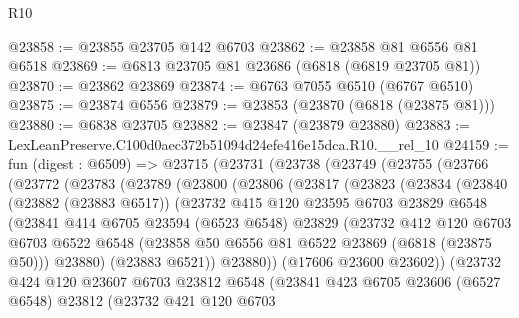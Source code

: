 \begin{lexlean}{R10}
\begin{coremodule}
@23858 := @23855 @23705 @142 @6703
@23862 := @23858 @81 @6556 @81 @6518
@23869 := @6813 @23705 @81 @23686 (@6818 (@6819 @23705 @81))
@23870 := @23862 @23869
@23874 := @6763 @7055 @6510 (@6767 @6510)
@23875 := @23874 @6556
@23879 := @23853 (@23870 (@6818 (@23875 @81)))
@23880 := @6838 @23705
@23882 := @23847 (@23879 @23880)
@23883 := LexLeanPreserve.C100d0aec372b51094d24efe416e15dca.R10.__rel_10
@24159 := fun (digest : @6509) =>
  @23715
    (@23731
      (@23738
        (@23749
          (@23755
            (@23766
              (@23772
                (@23783
                  (@23789
                    (@23800
                      (@23806
                        (@23817
                          (@23823
                            (@23834
                              (@23840
                                (@23882 (@23883 @6517))
                                (@23732
                                  @415
                                  @120
                                  @23595
                                  @6703
                                  @23829
                                  @6548
                                  (@23841
                                    @414
                                    @6705
                                    @23594
                                    (@6523 @6548)
                                    @23829
                                    (@23732
                                      @412
                                      @120
                                      @6703
                                      @6703
                                      @6522
                                      @6548
                                      (@23858 @50 @6556 @81 @6522 @23869 (@6818 (@23875 @50)))
                                      @23880)
                                    (@23883 @6521))
                                  @23880))
                              (@17606 @23600 @23602))
                            (@23732
                              @424
                              @120
                              @23607
                              @6703
                              @23812
                              @6548
                              (@23841
                                @423
                                @6705
                                @23606
                                (@6527 @6548)
                                @23812
                                (@23732
                                  @421
                                  @120
                                  @6703

\end{coremodule}
\end{lexlean}
